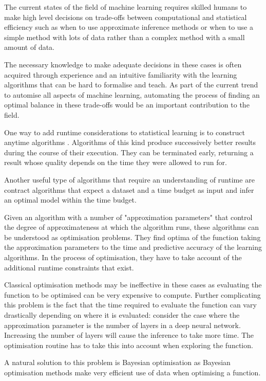 \documentclass[a4paper,12pt,twoside,openright]{report}
\begin{document}
The current states of the field of machine learning requires skilled humans to make high level decisions on trade-offs between computational and statistical efficiency such as when to use approximate inference methods or when to use a simple method with lots of data rather than a complex method with a small amount of data. 

The necessary knowledge to make adequate decisions in these cases is often acquired through experience and an intuitive familiarity with the learning algorithms that can be hard to formalise and teach. As part of the current trend to automise all aspects of machine learning, automating the process of finding an optimal balance in these trade-offs would be an important contribution to the field.


One way to add runtime considerations to statistical learning is to construct anytime algorithms \cite{conf/aaai/DeanB88}. Algorithms of this kind produce successively better results during the course of their execution. They can be terminated early, returning a result whose quality depends on the time they were allowed to run for.

Another useful type of algorithms that require an understanding of runtime are contract algorithms \cite{ZCCijcai99} that expect a dataset and a time budget as input and infer an optimal model within the time budget.



Given an algorithm with a number of "approximation parameters" that control the degree of approximateness at which the algorithm runs, these algorithms can be understood as optimisation problems. They find optima of the function taking the approximation parameters to the time and predictive accuracy of the learning algorithms. In the process of optimisation, they have to take account of the additional runtime constraints that exist.

Classical optimisation methods may be ineffective in these cases as evaluating the function to be optimised can be very expensive to compute. Further complicating this problem is the fact that the time required to evaluate the function can vary drastically depending on where it is evaluated: consider the case where the approximation parameter is the number of layers in a deep neural network. Increasing the number of layers will cause the inference to take more time. The optimisation routine has to take this into account when exploring the function. 

A natural solution to this problem is Bayesian optimisation as Bayesian optimisation methods make very efficient use of data when optimising a function.
\end{document}
